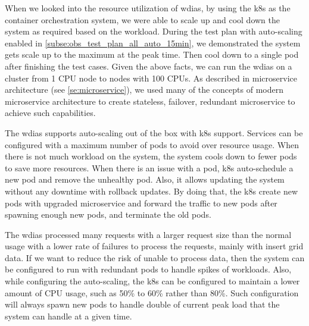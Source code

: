 When we looked into the resource utilization of \acrshort{wdias}, by using the \acrshort{k8s} as the container orchestration system, we were able to scale up and cool down the system as required based on the workload. During the test plan with auto-scaling enabled in \cref{subse:obs_test_plan_all_auto_15min}, we demonstrated the system gets scale up to the maximum at the peak time. Then cool down to a single pod after finishing the test cases. Given the above facts, we can run the \acrshort{wdias} on a cluster from 1 CPU node to nodes with 100 CPUs. As described in microservice architecture (see \cref{se:microservice}), we used many of the concepts of modern microservice architecture to create stateless, failover, redundant microservice to achieve such capabilities.

The \acrshort{wdias} supports auto-scaling out of the box with \acrshort{k8s} support. Services can be configured with a maximum number of pods to avoid over resource usage. When there is not much workload on the system, the system cools down to fewer pods to save more resources. When there is an issue with a pod, \acrshort{k8s} auto-schedule a new pod and remove the unhealthy pod. Also, it allows updating the system without any downtime with rollback updates. By doing that, the \acrshort{k8s} create new pods with upgraded microservice and forward the traffic to new pods after spawning enough new pods, and terminate the old pods.

The \acrshort{wdias} processed many requests with a larger request size than the normal usage with a lower rate of failures to process the requests, mainly with insert grid data. If we want to reduce the risk of unable to process data, then the system can be configured to run with redundant pods to handle spikes of workloads. Also, while configuring the auto-scaling, the \acrshort{k8s} can be configured to maintain a lower amount of CPU usage, such as 50\% to 60\% rather than 80\%. Such configuration will always spawn new pods to handle double of current peak load that the system can handle at a given time.
